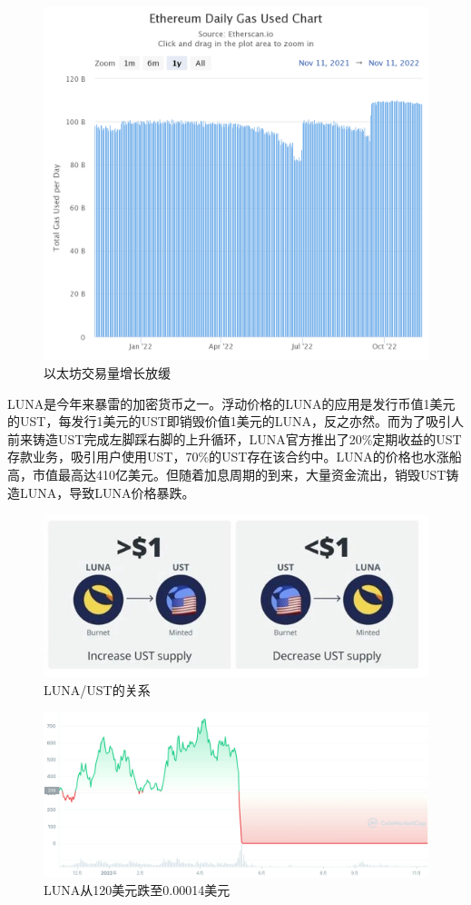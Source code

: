 \begin{figure}[H]
\begin{minipage}[t]{0.48\linewidth}
        \includegraphics[width=\linewidth]{img/ethereum-daily-gas-used.png}
        \caption{以太坊交易量增长放缓}
    \end{minipage}
\end{figure}

LUNA是今年来暴雷的加密货币之一。浮动价格的LUNA的应用是发行币值1美元的UST，每发行1美元的UST即销毁价值1美元的LUNA，反之亦然。而为了吸引人前来铸造UST完成左脚踩右脚的上升循环，LUNA官方推出了20\%定期收益的UST存款业务，吸引用户使用UST，70\%的UST存在该合约中。LUNA的价格也水涨船高，市值最高达410亿美元。但随着加息周期的到来，大量资金流出，销毁UST铸造LUNA，导致LUNA价格暴跌。
\begin{figure}
    \includegraphics[width=\linewidth]{img/ust.jpeg}
    \caption{LUNA/UST的关系}
\end{figure}
\begin{figure}
    \includegraphics[width=\linewidth]{img/luna.png}
    \caption{LUNA从120美元跌至0.00014美元}
\end{figure}

